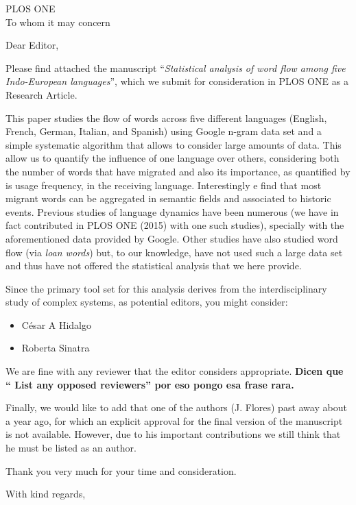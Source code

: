\documentclass[11pt, addrfooterall ]{if_letter_2013}
\begin{document}
\begin{letter}{
PLOS ONE\\
To whom it may concern
}
\opening{Dear Editor,}

Please find attached the manuscript ``{\it Statistical analysis of word flow
among five Indo-European languages}'', which we submit for consideration in
PLOS ONE as a Research Article. 

This paper studies the flow of words across five different languages (English,
French, German, Italian, and Spanish) using Google n-gram data set and a simple
systematic algorithm that allows to consider large amounts of data.  This allow
us to quantify the influence of one language over others, considering both the
number of words that have migrated and also its importance, as quantified by is
usage frequency, in the receiving language.  Interestingly e find that most
migrant words can be aggregated in semantic fields and associated to historic
events.
Previous studies of language dynamics have been numerous (we have in fact 
contributed in PLOS ONE (2015) with one such studies), specially with the
aforementioned data provided by Google. Other studies have also studied 
word flow (via {\it loan words}) but, to our knowledge, have not used such a
large data set and thus have not offered the statistical analysis that
we here provide. 


Since the primary tool set for this analysis derives from the interdisciplinary
study of complex systems, as potential editors, you might consider:
\begin{itemize}
\item César A Hidalgo
\item Roberta Sinatra
\end{itemize}
We are fine with any reviewer that the editor considers appropriate.
{\bf Dicen que ``
List any opposed reviewers'' por eso pongo esa frase rara. }


Finally, we would like to add that one of the authors (J. Flores) past away about a year
ago, for which an explicit approval for the final version of the manuscript is
not available. However, due to his important contributions we still think that
he must be listed as an author. 

Thank you very much for your time and consideration.



% 

\closing{With kind regards,}

\end{letter}
\end{document}
